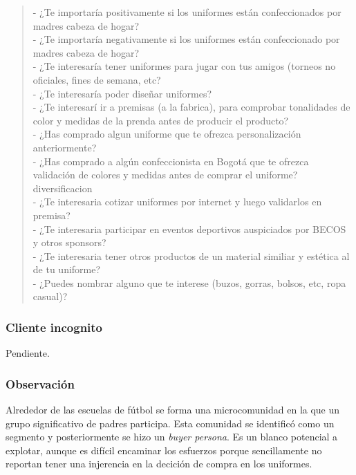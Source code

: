 \documentclass[11pt]{article}
\begin{document}
\begin{verse}
- ¿Te importaría positivamente si los uniformes están confeccionados por madres cabeza de hogar?\\
- ¿Te importaría negativamente si los uniformes están confeccionado por madres cabeza de hogar?\\
- ¿Te interesaría tener uniformes para jugar con tus amigos (torneos no oficiales, fines de semana, etc?\\
- ¿Te interesaría poder diseñar uniformes?\\
- ¿Te interesarí ir a premisas (a la fabrica), para comprobar tonalidades de color y medidas de la prenda antes de producir el producto?\\
- ¿Has comprado algun uniforme que te ofrezca personalización anteriormente?\\
- ¿Has comprado a algún confeccionista en Bogotá que te ofrezca validación de colores y medidas antes de comprar el uniforme?\\
\vspace*{1em}
diversificacion\\
- ¿Te interesaria cotizar uniformes por internet y luego validarlos en premisa?\\
- ¿Te interesaria participar en eventos deportivos auspiciados por BECOS y otros sponsors?\\
- ¿Te interesaria tener otros productos de un material similiar y estética al de tu uniforme?\\
- ¿Puedes nombrar alguno que te interese (buzos, gorras, bolsos, etc, ropa casual)?\\
\vspace*{1em}
\end{verse}

\subsubsection{Cliente incognito}
\label{sec:org36b66ce}

Pendiente.

\subsubsection{Observación}
\label{sec:org3559c96}

Alrededor de las escuelas de fútbol se forma una microcomunidad en la que un
grupo significativo de padres participa. Esta comunidad se identificó como
un segmento y posteriormente se hizo un \emph{buyer persona}. Es un blanco
potencial a explotar, aunque es difícil encaminar los esfuerzos porque
sencillamente no reportan tener una injerencia en la decición de compra en
los uniformes.
\end{document}
